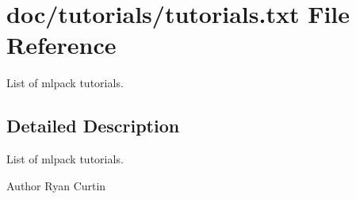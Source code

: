 \section{doc/tutorials/tutorials.txt File Reference}
\label{tutorials_8txt}


List of mlpack tutorials.  




\subsection{Detailed Description}
List of mlpack tutorials. 

\begin{DoxyAuthor}{Author}
Ryan Curtin 
\end{DoxyAuthor}
